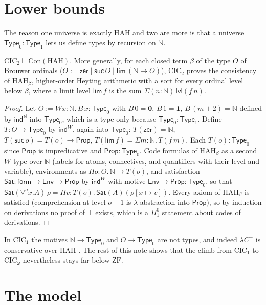 \documentclass[10pt]{article}
\newcommand{\N}{\mathbb{N}}
\newcommand{\Prop}{\mathsf{Prop}}
\newcommand{\Type}{\mathsf{Type}}
\newcommand{\CIC}{\mathrm{CIC}}
\newcommand{\ZF}{\mathrm{ZF}}
\newcommand{\HAH}{\mathrm{HAH}}
\newcommand{\Con}{\mathrm{Con}}
\begin{document}
\section{Lower bounds}\label{sec:lower}

The reason one universe is exactly $\HAH$ and two are more is that a universe
$\Type_0:\Type_1$ lets us define types by recursion on $\N$.

\begin{theorem}\label{thm:lower}
$\CIC_2\vdash\Con(\HAH)$. More generally, for each closed term $\beta$ of the
type $O$ of Brouwer ordinals ($O:=\mathsf{zer}\mid\mathsf{suc}\,O\mid
\mathsf{lim}\,(\N\to O)$), $\CIC_2$ proves the consistency of
$\HAH_\beta$, higher-order Heyting arithmetic with a sort for every ordinal
level below $\beta$, where a limit level $\mathsf{lim}\,f$ is the sum
$\Sigma(n:\N)\,\mathsf{lvl}(f\,n)$.
\end{theorem}
\begin{proof}
Let $O:=W x{:}\N.\,B\,x:\Type_0$ with $B\,0=\mathbf 0$, $B\,1=\mathbf 1$,
$B\,(m{+}2)=\N$ defined by $\mathsf{ind}^\N$ into $\Type_0$, which is a
type only because $\Type_0:\Type_1$. Define $T:O\to\Type_0$ by
$\mathsf{ind}^W$, again into $\Type_0$:
$T(\mathsf{zer})=\N$, $T(\mathsf{suc}\,o)=T(o)\to\Prop$,
$T(\mathsf{lim}\,f)=\Sigma m{:}\N.\,T(f\,m)$. Each $T(o):\Type_0$ since
$\Prop$ is impredicative and $\Prop:\Type_0$. Code formulas of $\HAH_\beta$
as a second $W$-type over $\N$ (labels for atoms, connectives, and
quantifiers with their level and variable), environments as
$\Pi o{:}O.\,\N\to T(o)$, and satisfaction
$\mathsf{Sat}:\mathsf{form}\to\mathsf{Env}\to\Prop$ by $\mathsf{ind}^W$ with
motive $\mathsf{Env}\to\Prop:\Type_0$, so that
$\mathsf{Sat}(\forall^o x.A)\,\rho=\Pi v{:}T(o).\,\mathsf{Sat}(A)(\rho[x\mapsto v])$.
Every axiom of $\HAH_\beta$ is satisfied (comprehension at level $o+1$ is
$\lambda$-abstraction into $\Prop$), so by induction on derivations no
proof of $\bot$ exists, which is a $\Pi^0_1$ statement about codes of
derivations.
\end{proof}

In $\CIC_1$ the motives $\N\to\Type_0$ and $O\to\Type_0$ are not types, and indeed
$\lambda C^+$ is conservative over $\HAH$ \cite{vdbergotten23}. The rest of
this note shows that the climb from $\CIC_1$ to $\CIC_\omega$ nevertheless
stays far below $\ZF$.

\section{The model}\label{sec:model}
\end{document}
